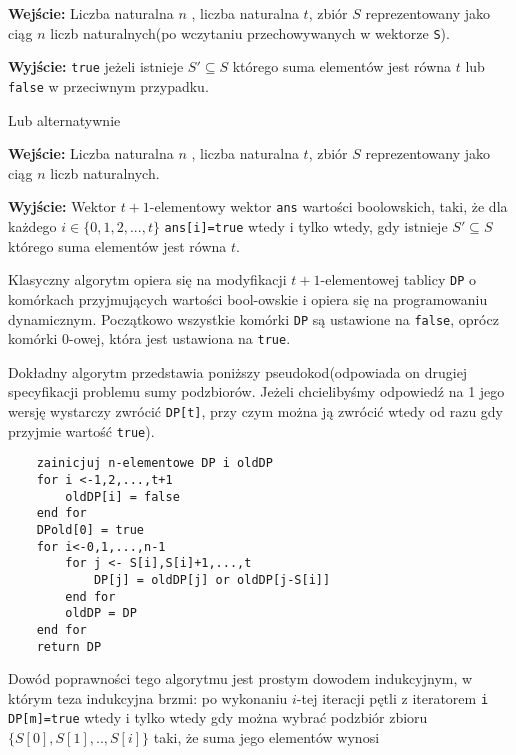 \documentclass{article}
\begin{document}
\begin{tcolorbox}
    \textbf{Wejście:} Liczba naturalna $n$ , liczba naturalna $t$, zbiór $S$ reprezentowany jako ciąg $n$ liczb naturalnych(po wczytaniu 
    przechowywanych w wektorze \texttt{S}).
    
    \textbf{Wyjście:} \texttt{true} jeżeli istnieje $S' \subseteq S$ którego suma elementów jest równa $t$ lub \texttt{false} w przeciwnym przypadku.
\end{tcolorbox}
Lub alternatywnie
\begin{tcolorbox}
    \textbf{Wejście:} Liczba naturalna $n$ , liczba naturalna $t$, zbiór $S$ reprezentowany jako ciąg $n$ liczb naturalnych.
    
    \textbf{Wyjście:} Wektor $t+1$-elementowy wektor \texttt{ans} wartości boolowskich, taki, że dla każdego
    $i \in \{0,1,2,...,t\}$ \texttt{ans[i]=true} wtedy i tylko wtedy, gdy
    istnieje $S' \subseteq S$ którego suma elementów jest równa $t$.
\end{tcolorbox}


Klasyczny algorytm opiera się na modyfikacji $t+1$-elementowej tablicy \texttt{DP} o komórkach przyjmujących wartości bool-owskie i 
opiera się na programowaniu dynamicznym. Początkowo wszystkie komórki \texttt{DP} są ustawione na \texttt{false}, oprócz komórki 
$0$-owej, która
jest ustawiona na \texttt{true}.

Dokładny algorytm przedstawia poniższy pseudokod(odpowiada on drugiej specyfikacji problemu sumy podzbiorów. Jeżeli chcielibyśmy
odpowiedź na 1 jego wersję wystarczy zwrócić \texttt{DP[t]}, przy czym można ją zwrócić wtedy od razu gdy przyjmie wartość \texttt{true}).
\begin{lstlisting}
    zainicjuj n-elementowe DP i oldDP
    for i <-1,2,...,t+1
        oldDP[i] = false
    end for 
    DPold[0] = true
    for i<-0,1,...,n-1
        for j <- S[i],S[i]+1,...,t
            DP[j] = oldDP[j] or oldDP[j-S[i]]
        end for
        oldDP = DP
    end for
    return DP
\end{lstlisting}

Dowód poprawności tego algorytmu jest prostym dowodem indukcyjnym, w którym teza indukcyjna
brzmi: po wykonaniu $i$-tej iteracji pętli z iteratorem \texttt{i}
 \texttt{DP[m]=true}
wtedy i tylko wtedy
gdy można wybrać podzbiór zbioru
$\{S\left[0\right],S\left[1\right],..,S\left[i\right]\}$
taki, że suma jego elementów wynosi 
\end{document}
